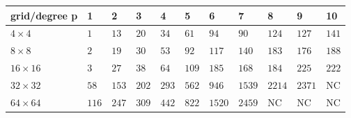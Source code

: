 \begin{tabular}{lllllllllll}
\hline
 grid/degree p   & 1     & 2     & 3     & 4     & 5     & 6      & 7      & 8      & 9      & 10    \\
\hline
 $4 \times 4$    & $1$   & $13$  & $20$  & $34$  & $61$  & $94$   & $90$   & $124$  & $127$  & $141$ \\
 $8 \times 8$    & $2$   & $19$  & $30$  & $53$  & $92$  & $117$  & $140$  & $183$  & $176$  & $188$ \\
 $16 \times 16$  & $3$   & $27$  & $38$  & $64$  & $109$ & $185$  & $168$  & $184$  & $225$  & $222$ \\
 $32 \times 32$  & $58$  & $153$ & $202$ & $293$ & $562$ & $946$  & $1539$ & $2214$ & $2371$ & NC    \\
 $64 \times 64$  & $116$ & $247$ & $309$ & $442$ & $822$ & $1520$ & $2459$ & NC     & NC     & NC    \\
\hline
\end{tabular}